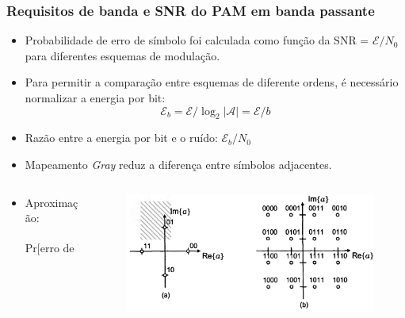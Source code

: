 \begin{frame}
	\frametitle{Requisitos de banda e SNR do PAM em banda passante}

	\vspace{-0.3cm}
	\begin{itemize}
	    \item Probabilidade de erro de símbolo foi calculada como função da SNR = $\mathcal{E}/N_0$ para diferentes esquemas de modulação.
	    \item Para permitir a comparação entre esquemas de diferente ordens, é necessário normalizar a energia por bit:
	    \begin{equation*}
		\mathcal{E}_b = \mathcal{E}/\log_2 |\mathcal{A}| = \mathcal{E}/b
	    \end{equation*}
	    \item Razão entre a energia por bit e o ruído: $\mathcal{E}_b / N_0$
	    \item Mapeamento \textit{Gray} reduz a diferença entre símbolos adjacentes.
	\end{itemize}	
	\begin{columns}
		\begin{column}{0.5\textwidth}
		    \begin{itemize}			
			\item Aproximação:
			\begin{small}
			\begin{equation*}
			    \text{Pr[erro de bit]} \approx \frac{1}{b}\text{Pr[erro de símbolo]}
			\end{equation*}
			\end{small}
		    \end{itemize}		    
		\end{column}
		\begin{column}{0.5\textwidth}
		    \begin{figure}[t]	
			\begin{center}\vspace{-0.5cm}
			    \includegraphics[width=\columnwidth]{figs/pam_48}
			\end{center}
		    \end{figure}
		\end{column}
	\end{columns}	
\end{frame}

